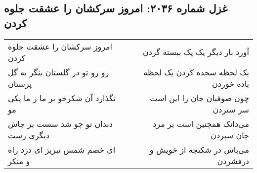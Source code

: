 \begin{center}
\section*{غزل شماره ۲۰۳۶: امروز سرکشان را عشقت جلوه کردن}
\label{sec:2036}
\begin{longtable}{l p{0.5cm} r}
امروز سرکشان را عشقت جلوه کردن
&&
آورد بار دیگر یک یک ببسته گردن
\\
رو رو تو در گلستان بنگر به گل پرستان
&&
یک لحظه سجده کردن یک لحظه باده خوردن
\\
نگذارد آن شکرخو بر ما ز ما یکی مو
&&
چون صوفیان جان را این است سر ستردن
\\
دندان تو چو شد سست بر جاش دیگری رست
&&
می‌دانک همچنین است بر مرد جان سپردن
\\
ای خصم شمس تبریز ای دزد راه و منکر
&&
می‌باش در شکنجه از خویش و درفشردن
\\
\end{longtable}
\end{center}
